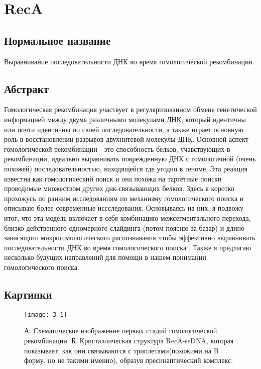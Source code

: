 \section{RecA}

\subsection{Нормальное название}

Выравнивание последовательности ДНК во время гомологической рекомбинации.

\subsection{Абстракт}

Гомологическая рекомбинация участвует в регуляризованном обмене генетической информацией между двумя различными молекулами ДНК, который идентичны или почти идентичны по своей последовательности, а также играет основную роль в восстановлении разрывов двухнитевой молекулы ДНК. Основной аспект гомологической рекомбинации - это способность белков, учавствующих в рекомбинации, идеально выравнивать поврежденную ДНК с гомологичной (очень похожей) последовательностью, находящейся где угодно в геноме. Эта реакция известна как гомологический поиск и она похожа на таргетные поиски проводимые множеством других днк-связывающих белков. Здесь я коротко прохожусь по ранним исследованиям по механизму гомологического поиска и описываю более современные иссследования. Основываясь на них, я подвожу итог, что эта модель включает в себя комбинацию межсегментального перехода, близко-действенного одномерного слайдинга (потом поясню за базар) и длино-зависящого микрогомологического распознавания чтобы эффективно выравнивать последовательности ДНК во время гомологического поиска . Также я предлагаю несколько будущих направлений для помощи в нашем понимании гомологического поиска.

\subsection{Картинки}

\begin{figure}[H]
	\centering
	\texttt{[image: 3\_1]}
	\caption{А. Схематическое изображение первых стадий гомологической рекомбинации. Б. Кристаллическая структура RecA-ssDNA, которая показывает, как они связываются с триплетами(похожими на B форму, но не такими именно), образуя пресинаптический комплекс.}
	\label{fig:3_1}
\end{figure}

